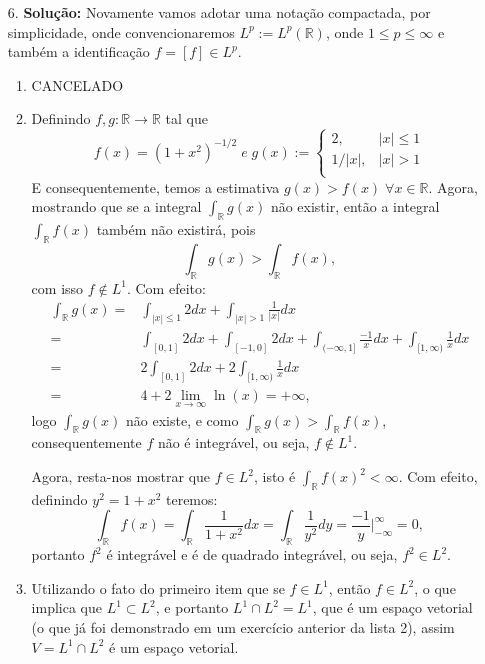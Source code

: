 \documentclass{article}
\begin{document}
\begin{enumerate}
		\item[6.] \textbf{Solução:} Novamente vamos adotar uma notação compactada, por simplicidade, onde convencionaremos $L^{p} := L^{p}(\mathbb{R})$, onde $1 \leq p \leq \infty$ e também a identificação $f = [f] \in L^{p}$.
			\begin{enumerate}
				\item CANCELADO
				\item Definindo $f, g:\mathbb{R} \to \mathbb{R} $ tal que 
				$$
				f(x) = (1+x^{2})^{-1/2} \; e \;
				g(x) := \left\{
				\begin{array}{cc}
				2, & |x| \leq 1 \\
				1/|x|, & |x| > 1 \\
				\end{array}
				\right.
				$$
				E consequentemente, temos a estimativa $g(x) > f(x) \; \forall x \in \mathbb{R}$. Agora, mostrando que se a integral $\int_{\mathbb{R}}g(x)$ não existir, então a integral $\int_{\mathbb{R}}f(x)$ também não existirá, pois
				$$
				\int_{\mathbb{R}}g(x) > \int_{\mathbb{R}}f(x),
				$$
				com isso $f \notin L^{1}$. Com efeito:
				$$
				\begin{aligned}
				\int_{\mathbb{R}}g(x) 
				= & \int_{|x| \leq 1} 2 dx + \int_{|x| > 1} \frac{1}{|x|} dx \\
				= & \int_{[0,1]} 2 dx + \int_{[-1,0]} 2 dx + \int_{(-\infty, 1]}\frac{-1}{x}dx + \int_{[1, \infty)}\frac{1}{x}dx \\
				= & 2\int_{[0,1]} 2 dx +  2\int_{[1, \infty)}\frac{1}{x}dx \\
				= & 4 + 2 \lim_{x \to \infty} \ln(x) = +\infty,  
				\end{aligned}
				$$
				logo 
				$\int_{\mathbb{R}}g(x)$ não existe, e como $\int_{\mathbb{R}}g(x)> \int_{\mathbb{R}}f(x)$, consequentemente $f$ não é integrável, ou seja, $f \notin L^{1}$.
				
				Agora, resta-nos mostrar que $f \in L^{2}$, isto é $\int_{\mathbb{R}}f(x)^{2} <\infty$. Com efeito, definindo $y^{2} = 1+x^{2}$ teremos:
				$$
				\int_{\mathbb{R}}f(x) 
				= \int_{\mathbb{R}}\frac{1}{1+x^{2}}dx = \int_{\mathbb{R}}\frac{1}{y^{2}}dy = \frac{ -1}{y} \Big|^{\infty}_{-\infty} = 0,
				$$
				portanto $f^{2}$ é integrável e é de quadrado integrável, ou seja, $f^{2} \in L^{2}$.
				
				\item Utilizando o fato do primeiro item que se $f \in L^{1}$, então $f \in L^{2}$, o que implica que $L^{1} \subset L^{2}$, e portanto $L^{1} \cap L^{2} = L^{1}$, que é um espaço vetorial (o que já foi demonstrado em um exercício anterior da lista 2), assim $V= L^{1} \cap L^{2}$ é um espaço vetorial.
				

\end{enumerate}
\end{enumerate}
\end{document}
